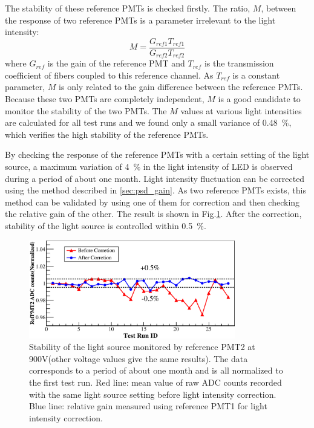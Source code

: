 \documentclass[review, times]{elsarticle}
\begin{document}
The stability of these reference PMTs is checked firstly. The ratio, $M$, between the response of two reference PMTs is a parameter irrelevant to the light intensity:
\begin{equation}
 M = \frac{G_{ref1} T_{ref1}}{G_{ref2} T_{ref2}}
\end{equation}
where $G_{ref}$ is the gain of the reference PMT and $T_{ref}$ is the transmission coefficient of fibers coupled to this reference channel.
As $T_{ref}$ is a constant parameter, $M$ is only related to the gain difference between the reference PMTs.
Because these two PMTs are completely independent, $M$ is a good candidate to monitor the stability of the two PMTs. 
The $M$ values at various light intensities are calculated for all test runs and we found only a small variance of \SI{0.48}{\percent}, which verifies the high stability of the reference PMTs.

By checking the response of the reference PMTs with a certain setting of the light source, a maximum variation of \SI{4}{\percent} in the light intensity of LED is observed during a period of about one month.
Light intensity fluctuation can be corrected using the method described in \ref{sec:psd_gain}.
As two reference PMTs exists, this method can be validated by using one of them for correction and then checking the relative gain of the other. 
The result is shown in Fig.\ref{fig:FIG13}.
After the correction, stability of the light source is controlled within \textpm\SI{0.5}{\percent}.

\begin{figure}
 \centering
 \includegraphics[width=90mm]{FIG13}
\caption{Stability of the light source monitored by reference PMT2 at 900V(other voltage values give the same results).
The data corresponds to a period of about one month and is all normalized to the first test run.
Red line: mean value of raw ADC counts recorded with the same light source setting before light intensity correction.
Blue line: relative gain measured using reference PMT1 for light intensity correction.}
\label{fig:FIG13}
\end{figure} 
\end{document}
